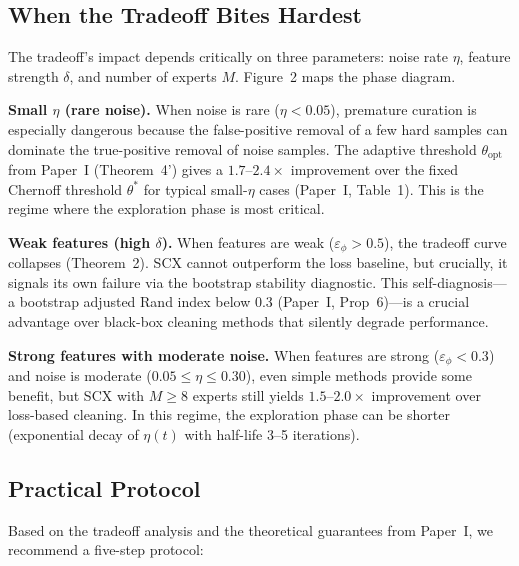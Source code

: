 \subsection{When the Tradeoff Bites Hardest}

The tradeoff's impact depends critically on three parameters: noise rate $\eta$, feature strength $\delta$, and number of experts $M$. Figure~2 maps the phase diagram.

\textbf{Small $\eta$ (rare noise).} When noise is rare ($\eta < 0.05$), premature curation is especially dangerous because the false-positive removal of a few hard samples can dominate the true-positive removal of noise samples. The adaptive threshold $\theta_{\text{opt}}$ from Paper~I (Theorem~4') gives a $1.7$--$2.4\times$ improvement over the fixed Chernoff threshold $\theta^*$ for typical small-$\eta$ cases (Paper~I, Table~1). This is the regime where the exploration phase is most critical.

\textbf{Weak features (high $\delta$).} When features are weak ($\varepsilon_\phi > 0.5$), the tradeoff curve collapses (Theorem~2). SCX cannot outperform the loss baseline, but crucially, it signals its own failure via the bootstrap stability diagnostic. This self-diagnosis---a bootstrap adjusted Rand index below 0.3 (Paper~I, Prop~6)---is a crucial advantage over black-box cleaning methods that silently degrade performance.

\textbf{Strong features with moderate noise.} When features are strong ($\varepsilon_\phi < 0.3$) and noise is moderate ($0.05 \leq \eta \leq 0.30$), even simple methods provide some benefit, but SCX with $M \geq 8$ experts still yields $1.5$--$2.0\times$ improvement over loss-based cleaning. In this regime, the exploration phase can be shorter (exponential decay of $\eta(t)$ with half-life 3--5 iterations).

\subsection{Practical Protocol}

Based on the tradeoff analysis and the theoretical guarantees from Paper~I, we recommend a five-step protocol:

